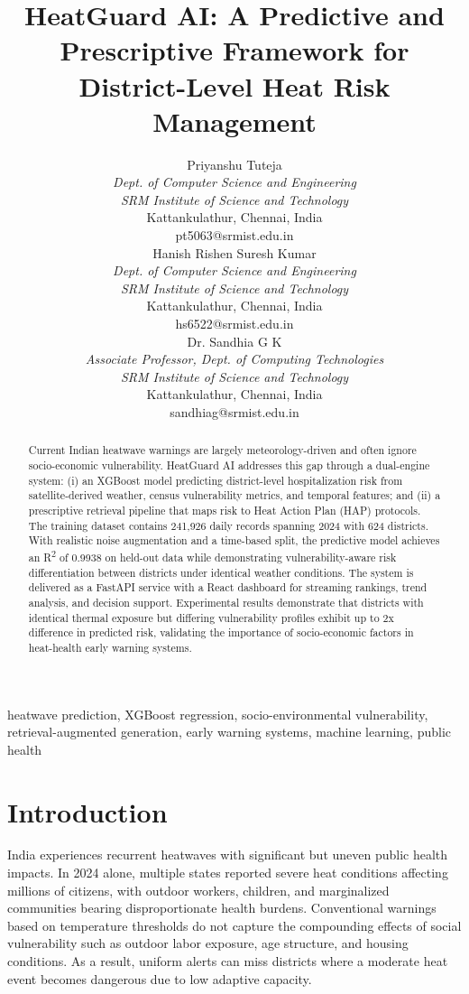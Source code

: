 \documentclass[conference]{IEEEtran}
\title{HeatGuard AI: A Predictive and Prescriptive Framework for District-Level Heat Risk Management}
\author{
\begin{minipage}{0.32\textwidth}
\centering
Priyanshu Tuteja \\
\textit{Dept. of Computer Science and Engineering} \\
\textit{SRM Institute of Science and Technology} \\
Kattankulathur, Chennai, India \\
pt5063@srmist.edu.in
\end{minipage}
\hfill
\begin{minipage}{0.32\textwidth}
\centering
Hanish Rishen Suresh Kumar \\
\textit{Dept. of Computer Science and Engineering} \\
\textit{SRM Institute of Science and Technology} \\
Kattankulathur, Chennai, India \\
hs6522@srmist.edu.in
\end{minipage}
\hfill
\begin{minipage}{0.32\textwidth}
\centering
Dr. Sandhia G K \\
\textit{Associate Professor, Dept. of Computing Technologies} \\
\textit{SRM Institute of Science and Technology} \\
Kattankulathur, Chennai, India \\
sandhiag@srmist.edu.in
\end{minipage}
}
\begin{document}
\maketitle

\begin{abstract}
Current Indian heatwave warnings are largely meteorology-driven and often ignore socio-economic vulnerability. HeatGuard AI addresses this gap through a dual-engine system: (i) an XGBoost model predicting district-level hospitalization risk from satellite-derived weather, census vulnerability metrics, and temporal features; and (ii) a prescriptive retrieval pipeline that maps risk to Heat Action Plan (HAP) protocols. The training dataset contains 241,926 daily records spanning 2024 with 624 districts. With realistic noise augmentation and a time-based split, the predictive model achieves an R\textsuperscript{2} of 0.9938 on held-out data while demonstrating vulnerability-aware risk differentiation between districts under identical weather conditions. The system is delivered as a FastAPI service with a React dashboard for streaming rankings, trend analysis, and decision support. Experimental results demonstrate that districts with identical thermal exposure but differing vulnerability profiles exhibit up to 2x difference in predicted risk, validating the importance of socio-economic factors in heat-health early warning systems.
\end{abstract}

\begin{IEEEkeywords}
heatwave prediction, XGBoost regression, socio-environmental vulnerability, retrieval-augmented generation, early warning systems, machine learning, public health
\end{IEEEkeywords}

\section{Introduction}
\label{sec:introduction}

India experiences recurrent heatwaves with significant but uneven public health impacts. In 2024 alone, multiple states reported severe heat conditions affecting millions of citizens, with outdoor workers, children, and marginalized communities bearing disproportionate health burdens. Conventional warnings based on temperature thresholds do not capture the compounding effects of social vulnerability such as outdoor labor exposure, age structure, and housing conditions. As a result, uniform alerts can miss districts where a moderate heat event becomes dangerous due to low adaptive capacity.
\end{document}
